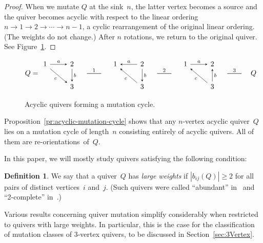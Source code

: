\documentclass[11pt, letterpaper]{amsart}
\theoremstyle{definition}
\newtheorem{definition}[theorem]{Definition}
\numberwithin{equation}{section}
\newcommand{\mutation}[1]{\stackrel{#1}{\rule[.5ex]{2em}{0.5pt}}}
\begin{document}
\begin{proof}
When we mutate $Q$ at the sink~$n$, the latter vertex becomes a source
and the quiver becomes acyclic with respect to the linear ordering \hbox{$n\to 1\to 2\to\cdots \to n-1$},
a cyclic rearrangement of the original linear ordering. (The weights do not change.) 
After $n$ rotations, we return to the original quiver. See Figure~\ref{fig:central-triangle}. 
\end{proof}

\begin{figure}[ht]
\begin{equation*}
Q=\begin{tikzcd}[arrows={-stealth}]
  1 \arrow[r, "a"]  \arrow[rd, swap,"c"] 
  & 2 \arrow[d, "b" ] 
  \\
  & 3
\end{tikzcd}
\quad \mutation{1}
\quad
\begin{tikzcd}[arrows={-stealth}]
  1    
  & 2 \arrow[d, "b" ]  \arrow[l, swap, "a"]
  \\
  & 3 \arrow[lu, "c"]
\end{tikzcd}
\quad \mutation{2}
\quad
\begin{tikzcd}[arrows={-stealth}]
  1    \arrow[r, "a"]
  & 2  
  \\
  & 3 \arrow[lu, "c"] \arrow[u, swap, "b" ] 
\end{tikzcd}
\quad \mutation{3}
\quad
Q
\end{equation*}
\vspace{-.1in}
\caption{Acyclic quivers forming a mutation cycle. } 
\label{fig:central-triangle}
\end{figure}

Proposition~\ref{pr:acyclic-mutation-cycle} shows that any $n$-vertex acyclic quiver~$Q$ lies on a mutation cycle of length~$n$
consisting entirely of acyclic quivers. 
All of them are re-orientations~of~$Q$. 

\medskip

In this paper, we will mostly study quivers satisfying the following condition:  

\begin{definition}
\label{def:largeWeights}
We say that a quiver~$Q$ has \emph{large weights} if $|b_{ij}(Q)| \geq 2$ for all pairs of distinct vertices~$i$ and~$j$. 
(Such quivers were called ``abundant'' in~\cite{Warkentin} and ``2-complete'' in~\cite{Felikson-Tumarkin-2018, LeeLee}.)
\end{definition}

Various results concerning quiver mutation simplify considerably when restricted to quivers with large weights. 
In particular, this is the case for the classification of mutation classes of 3-vertex quivers, to be discussed in Section~\ref{sec:3Vertex}. 
\end{document}
